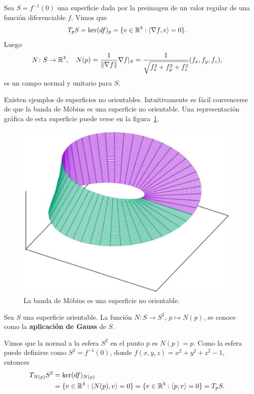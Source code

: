 \begin{example}
	Sea $S=f^{-1}(0)$ una superficie dada por la preimagen de un valor regular
	de una función diferenciable $f$. Vimos que 
	\[
		T_pS=\ker (df)_p=\{v\in\mathbb{R}^3:\langle \nabla f,v\rangle=0\}.
	\]
	Luego 
	\[
		N\colon S\to\mathbb{R}^3,\quad
		N(p)=\frac{1}{\|\nabla f\|}\nabla f|_S=\frac{1}{\sqrt{f_x^2+f_y^2+f_z^2}}(f_x,f_y,f_z), 
	\]
	es un campo normal y unitario para $S$.
\end{example}

Existen ejemplos de superficies no orientables. Intuitivamente es fácil
convencerse de que la banda de M\"obius es una superficie no orientable. Una
representación gráfica de esta superficie puede verse en la
figura~\ref{fig:Moebius}.
\begin{figure}[h]
		\centering
    	\includegraphics[scale=0.3]{eps/moebius}
		\caption{La banda de M\"obius es una superficie no orientable.}
		\label{fig:Moebius}
\end{figure}

\begin{definition}
	Sea $S$ una superficie orientable. La función $N\colon S\to S^2$, $p\mapsto
	N(p)$, se conoce como la \textbf{aplicación de Gauss} de $S$. 
\end{definition}

Vimos que la normal a la esfera $S^2$ en el punto $p$ es
$N(p)=p$. Como la esfera puede definirse como $S^2=f^{-1}(0)$, donde
$f(x,y,z)=x^2+y^2+z^2-1$, entonces 
\begin{align*}
	T_{N(p)}S^2&=\ker (df)_{N(p)}\\
	&=\{v\in\mathbb{R}^3:\langle N(p),v\rangle=0\}
	=\{ v\in\mathbb{R}^3:\langle p,v\rangle=0\}=T_pS.
\end{align*}

